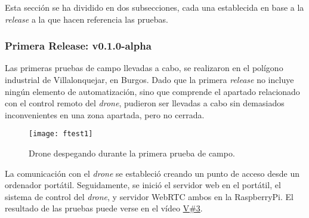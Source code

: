 Esta sección se ha dividido en dos subsecciones, cada una establecida en base a la \emph{release} a la que hacen referencia las pruebas. 


\subsubsection{Primera Release: v0.1.0-alpha}
\label{subsec:fieldTestingv1}

Las primeras pruebas de campo llevadas a cabo, se realizaron en el polígono industrial de Villalonquejar, en Burgos. 
Dado que la primera \emph{release} no incluye ningún elemento de automatización, sino que comprende el apartado relacionado con el control remoto del \emph{drone}, pudieron ser llevadas a cabo sin demasiados inconvenientes en una zona apartada, pero no cerrada. 

\begin{figure}
	\centering
	\texttt{[image: ftest1]}
	\caption[Field Test 1. Villalonquejar]{Drone despegando durante la primera prueba de campo.}\label{fig:ftest1Drone}
\end{figure}

La comunicación con el \emph{drone} se estableció creando un punto de acceso desde un ordenador portátil. Seguidamente, se inició el servidor web en el portátil, el sistema de control del \emph{drone}, y servidor WebRTC ambos en la RaspberryPi. El resultado de las pruebas puede verse en el vídeo \href{https://universidaddeburgos-my.sharepoint.com/:v:/g/personal/mbm0089_alu_ubu_es/ERit03PQ4GVJvVXNLCxQQwUBUjZt6VjCwl5GcLUYwFQGPQ?e=dD258g}{V\#3}.

